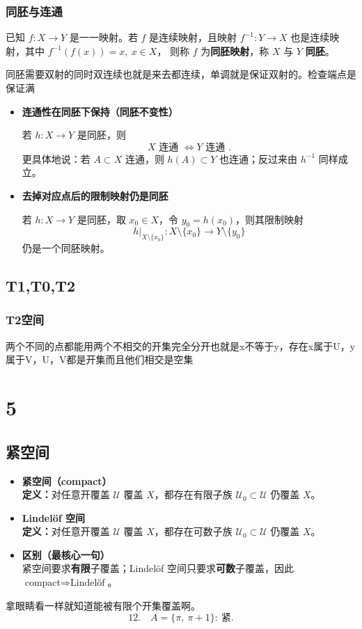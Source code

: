 \subsection{同胚与连通}
\begin{definition}[同胚]
已知 $f:X\to Y$ 是一一映射。若 $f$ 是连续映射，且映射
$f^{-1}:Y\to X$ 也是连续映射，其中 $f^{-1}(f(x))=x,\ x\in X$，
则称 $f$ 为\textbf{同胚映射}，称 $X$ 与 $Y$ \textbf{同胚}。
\end{definition}
\begin{dxtips}
    同胚需要双射的同时双连续也就是来去都连续，单调就是保证双射的。检查端点是保证满
\end{dxtips}
\begin{itemize}
  \item \textbf{连通性在同胚下保持（同胚不变性）}  

  若 $h:X\to Y$ 是同胚，则
  \[
  X \text{ 连通 } \Longleftrightarrow Y \text{ 连通 }.
  \]
  更具体地说：若 $A\subset X$ 连通，则 $h(A)\subset Y$ 也连通；反过来由 $h^{-1}$ 同样成立。

  \item \textbf{去掉对应点后的限制映射仍是同胚}  

  若 $h:X\to Y$ 是同胚，取 $x_0\in X$，令 $y_0=h(x_0)$，则其限制映射
  \[
  h\big|_{X\setminus\{x_0\}}:X\setminus\{x_0\}\longrightarrow Y\setminus\{y_0\}
  \]
  仍是一个同胚映射。
\end{itemize}
\section{T1,T0,T2}
\subsection{T2空间}
两个不同的点都能用两个不相交的开集完全分开也就是x不等于y，存在x属于U，y属于V，U，V都是开集而且他们相交是空集
\chapter{5}
\section{紧空间}
\begin{itemize}
  \item \textbf{紧空间（compact）}\\
  \textbf{定义：}对任意开覆盖 $\mathcal U$ 覆盖 $X$，都存在有限子族 $\mathcal U_0\subset \mathcal U$ 仍覆盖 $X$。

  \item \textbf{Lindel\"of 空间}\\
  \textbf{定义：}对任意开覆盖 $\mathcal U$ 覆盖 $X$，都存在可数子族 $\mathcal U_0\subset \mathcal U$ 仍覆盖 $X$。

  \item \textbf{区别（最核心一句）}\\
  紧空间要求\textbf{有限}子覆盖；Lindel\"of 空间只要求\textbf{可数}子覆盖，因此 $\text{compact}\Rightarrow \text{Lindel\"of}$。
\end{itemize}
拿眼睛看一样就知道能被有限个开集覆盖啊。
\[
12.\quad A=\{\pi,\ \pi+1\}:\ \text{紧}.
\]
